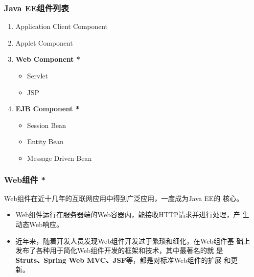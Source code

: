 \begin{frame}
  \frametitle{Java EE组件列表}
  
  \begin{enumerate}
  \item Application Client Component 
  \item Applet Component
  \item {\bf\Blue Web Component *} 
    \begin{itemize}
    \item Servlet 
    \item JSP
    \end{itemize}
  \item {\bf\Blue EJB Component *}
    \begin{itemize}
    \item Session Bean
    \item Entity Bean
    \item Message Driven Bean
    \end{itemize}
  \end{enumerate}
\end{frame}


\begin{frame}
  \frametitle{Web组件 *}

  {\hei Web组件在近十几年的互联网应用中得到广泛应用，一度成为Java EE的
    核心。}
  
  \begin{itemize}\kai
  \item Web组件运行在服务器端的Web容器内，能接收HTTP请求并进行处理，产
    生动态Web响应。
  \item 近年来，随着开发人员发现Web组件开发过于繁琐和细化，在Web组件基
    础上发布了各种用于简化Web组件开发的框架和技术，其中最著名的就
    是{\bf\Blue Struts、Spring Web MVC、JSF}等，都是对标准Web组件的扩展
    和更新。
  \end{itemize}
\end{frame}

